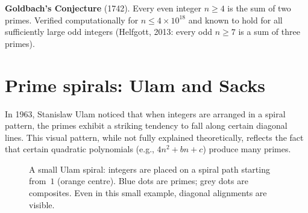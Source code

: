 \documentclass[12pt,a4paper,openany]{book}
\theoremstyle{definition}
\theoremstyle{plain}
\theoremstyle{remark}
\begin{document}
\medskip
\noindent\textbf{Goldbach's Conjecture} (1742).
Every even integer $n \ge 4$ is the sum of two primes. Verified computationally
for $n \le 4 \times 10^{18}$ and known to hold for all sufficiently large odd
integers (Helfgott, 2013: every odd $n \ge 7$ is a sum of three primes).

\section{Prime spirals: Ulam and Sacks}
\label{sec:prime-spirals}

In 1963, Stanislaw Ulam noticed that when integers are
arranged in a spiral pattern, the primes exhibit a striking tendency to fall
along certain diagonal lines. This visual pattern, while not fully explained
theoretically, reflects the fact that certain quadratic polynomials
(e.g., $4n^2 + bn + c$) produce many primes.

\begin{figure}[ht]
\centering
{}
\caption{A small Ulam spiral: integers are placed on a spiral path starting
  from~$1$ (orange centre). Blue dots are primes; grey dots are composites.
  Even in this small example, diagonal alignments are visible.}
\label{fig:ulam-spiral}
\end{figure}
\end{document}
